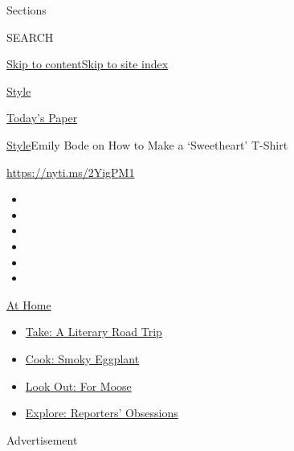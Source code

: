 Sections

SEARCH

\protect\hyperlink{site-content}{Skip to
content}\protect\hyperlink{site-index}{Skip to site index}

\href{https://www.nytimes.com/section/style}{Style}

\href{https://myaccount.nytimes.com/auth/login?response_type=cookie\&client_id=vi}{}

\href{https://www.nytimes.com/section/todayspaper}{Today's Paper}

\href{/section/style}{Style}\textbar{}Emily Bode on How to Make a
`Sweetheart' T-Shirt

\url{https://nyti.ms/2YigPM1}

\begin{itemize}
\item
\item
\item
\item
\item
\item
\end{itemize}

\href{https://www.nytimes.com/spotlight/at-home?action=click\&pgtype=Article\&state=default\&region=TOP_BANNER\&context=at_home_menu}{At
Home}

\begin{itemize}
\tightlist
\item
  \href{https://www.nytimes.com/2020/07/28/books/time-for-a-literary-road-trip.html?action=click\&pgtype=Article\&state=default\&region=TOP_BANNER\&context=at_home_menu}{Take:
  A Literary Road Trip}
\item
  \href{https://www.nytimes.com/2020/07/29/magazine/bored-with-your-home-cooking-some-smoky-eggplant-will-fix-that.html?action=click\&pgtype=Article\&state=default\&region=TOP_BANNER\&context=at_home_menu}{Cook:
  Smoky Eggplant}
\item
  \href{https://www.nytimes.com/2020/07/27/travel/moose-michigan-isle-royale.html?action=click\&pgtype=Article\&state=default\&region=TOP_BANNER\&context=at_home_menu}{Look
  Out: For Moose}
\item
  \href{https://www.nytimes.com/interactive/2020/at-home/even-more-reporters-editors-diaries-lists-recommendations.html?action=click\&pgtype=Article\&state=default\&region=TOP_BANNER\&context=at_home_menu}{Explore:
  Reporters' Obsessions}
\end{itemize}

Advertisement

